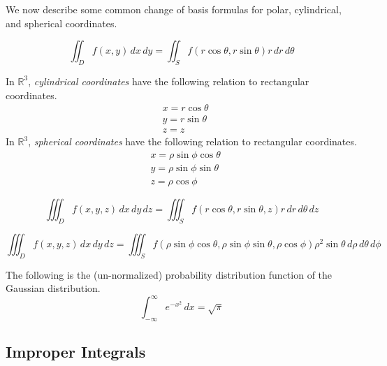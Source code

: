   We now describe some common change of basis formulas for polar, cylindrical, and spherical coordinates. 

  \begin{theorem}
    \begin{equation}
      \iint_{D} f(x, y) \, dx \,dy = \iint_S f(r \cos{\theta}, r \sin{\theta}) r \, dr \, d\theta
    \end{equation}
  \end{theorem}

  \begin{definition}
  In $\mathbb{R}^3$, \textit{cylindrical coordinates} have the following relation to rectangular coordinates. 
  \begin{align}
      & x = r \cos{\theta} \\
      & y = r \sin{\theta} \\
      & z = z
  \end{align}
  In $\mathbb{R}^3$, \textit{spherical coordinates} have the following relation to rectangular coordinates. 
  \begin{align*}
      & x = \rho \sin{\phi} \cos{\theta} \\
      & y = \rho \sin{\phi} \sin{\theta} \\
      & z = \rho \cos{\phi}
  \end{align*}
  \end{definition}

  \begin{corollary}
  \[\iiint_D f(x, y, z) \, dx \, dy \, dz = \iiint_S f( r \cos{\theta}, r \sin{\theta}, z) r \, dr \, d\theta \, dz\]
  \end{corollary}

  \begin{corollary}
  \[\iiint_D f(x, y, z) \,dx\,dy\,dz = \iiint_S f(\rho \sin{\phi} \cos{\theta}, \rho \sin{\phi} \sin{\theta}, \rho \cos{\phi}) \rho^2 \sin{\theta} \, d\rho \, d\theta \, d\phi\]
  \end{corollary}

  \begin{example}
  The following is the (un-normalized) probability distribution function of the Gaussian distribution. 
  \[\int_{-\infty}^{\infty} e^{-x^2} \, dx = \sqrt{\pi}\]
  \end{example}

\subsection{Improper Integrals}

